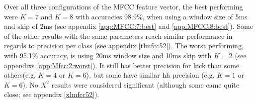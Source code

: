 %			
		

		Over all three configurations of the MFCC feature vector, the best performing were $K=7$ and $K=8$ with accuracies 98.9\%, when using a window size of 5ms and skip of 2ms (see appendix \ref{app:MFCC:7:best} and \ref{app:MFCC:8:best}). Some of the other results with the same parameters reach similar performance in regards to precision per class (see appendix \ref{tlmfcc52}). The worst performing, with 95.1\% accuracy, is using 20ms window size and 10ms skip with $K=2$ (see appendixs \ref{app:Mfcc:2:worst}). It still has better precision for kick than some others(e.g. $K=4$ or $K=6$), but some have similar hh precision (e.g. $K=1$ or $K=6$). No $X^2$ results were considered significant (although some came quite close; see appendix \ref{xlmfcc52}).
		
